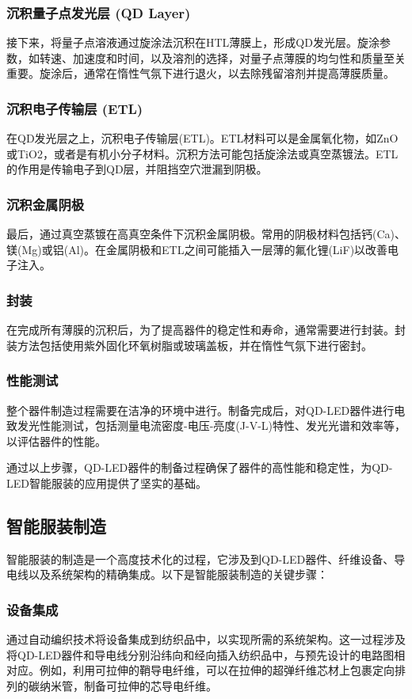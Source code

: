 \documentclass[12pt,hyperref,a4paper,UTF8]{ctexart}
\begin{document}
\subsubsection*{沉积量子点发光层 (QD Layer)}
接下来，将量子点溶液通过旋涂法沉积在HTL薄膜上，形成QD发光层。旋涂参数，如转速、加速度和时间，以及溶剂的选择，对量子点薄膜的均匀性和质量至关重要。旋涂后，通常在惰性气氛下进行退火，以去除残留溶剂并提高薄膜质量。

\subsubsection*{沉积电子传输层 (ETL)}
在QD发光层之上，沉积电子传输层(ETL)。ETL材料可以是金属氧化物，如ZnO或TiO2，或者是有机小分子材料。沉积方法可能包括旋涂法或真空蒸镀法。ETL的作用是传输电子到QD层，并阻挡空穴泄漏到阴极。

\subsubsection*{沉积金属阴极}
最后，通过真空蒸镀在高真空条件下沉积金属阴极。常用的阴极材料包括钙(Ca)、镁(Mg)或铝(Al)。在金属阴极和ETL之间可能插入一层薄的氟化锂(LiF)以改善电子注入。

\subsubsection*{封装}
在完成所有薄膜的沉积后，为了提高器件的稳定性和寿命，通常需要进行封装。封装方法包括使用紫外固化环氧树脂或玻璃盖板，并在惰性气氛下进行密封。

\subsubsection*{性能测试}
整个器件制造过程需要在洁净的环境中进行。制备完成后，对QD-LED器件进行电致发光性能测试，包括测量电流密度-电压-亮度(J-V-L)特性、发光光谱和效率等，以评估器件的性能。

通过以上步骤，QD-LED器件的制备过程确保了器件的高性能和稳定性，为QD-LED智能服装的应用提供了坚实的基础。





\subsection{智能服装制造}
智能服装的制造是一个高度技术化的过程，它涉及到QD-LED器件、纤维设备、导电线以及系统架构的精确集成。以下是智能服装制造的关键步骤：

\subsubsection*{设备集成}
通过自动编织技术将设备集成到纺织品中，以实现所需的系统架构。这一过程涉及将QD-LED器件和导电线分别沿纬向和经向插入纺织品中，与预先设计的电路图相对应。例如，利用可拉伸的鞘导电纤维，可以在拉伸的超弹纤维芯材上包裹定向排列的碳纳米管，制备可拉伸的芯导电纤维。
\end{document}
